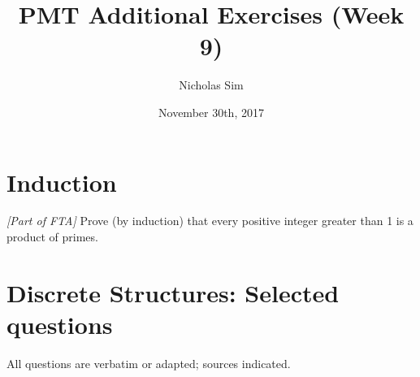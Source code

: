 \documentclass[10pt,a4paper]{article}
\begin{document}
\title{PMT Additional Exercises (Week 9)}
\author{Nicholas Sim}
\date{November 30th, 2017}
\maketitle{}


\section{Induction}
\emph{[Part of FTA]} Prove (by induction) that every positive integer greater than 1 is a product of primes.

\section{Discrete Structures: Selected questions}
All questions are verbatim or adapted; sources indicated.
\end{document}
